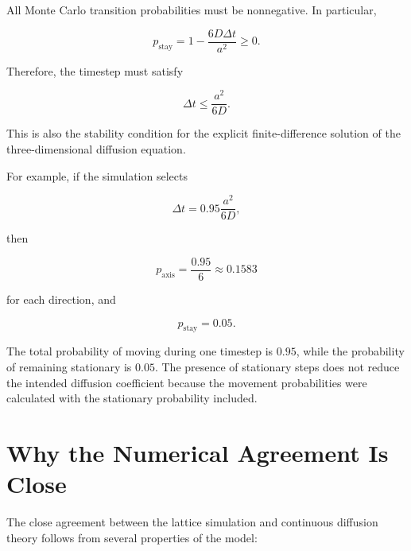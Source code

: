 \documentclass[11pt]{article}
\begin{document}
All Monte Carlo transition probabilities must be nonnegative. In particular,

\begin{equation}
    p_{\mathrm{stay}}
    =
    1-\frac{6D\Delta t}{a^2}
    \geq0.
\end{equation}

Therefore, the timestep must satisfy

\begin{equation}
    \boxed{
        \Delta t
        \leq
        \frac{a^2}{6D}
    }.
\end{equation}

This is also the stability condition for the explicit finite-difference solution of the three-dimensional diffusion equation.

For example, if the simulation selects

\begin{equation}
    \Delta t
    =
    0.95\frac{a^2}{6D},
\end{equation}

then

\begin{equation}
    p_{\mathrm{axis}}
    =
    \frac{0.95}{6}
    \approx
    0.1583
\end{equation}

for each direction, and

\begin{equation}
    p_{\mathrm{stay}}
    =
    0.05.
\end{equation}

The total probability of moving during one timestep is \(0.95\), while the probability of remaining stationary is \(0.05\). The presence of stationary steps does not reduce the intended diffusion coefficient because the movement probabilities were calculated with the stationary probability included.

\section{Why the Numerical Agreement Is Close}

The close agreement between the lattice simulation and continuous diffusion theory follows from several properties of the model:
\end{document}
